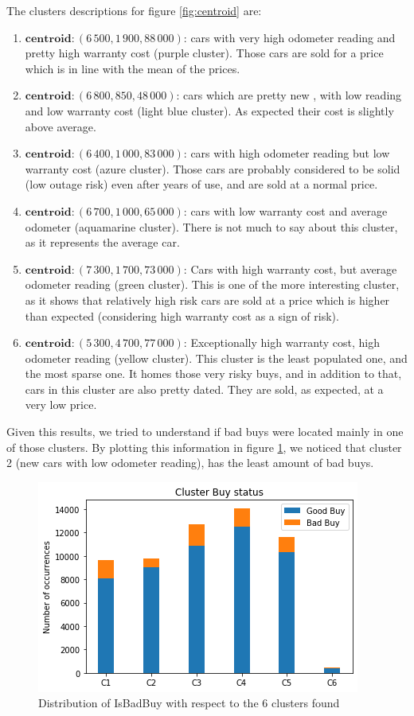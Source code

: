 \documentclass{article}
\begin{document}
The clusters descriptions for figure \ref{fig:centroid} are:
\begin{enumerate}
    \item $\mathbf{centroid}: (6\,500,  1\,900,  88\,000)$: cars with very high odometer reading and pretty high warranty cost (purple cluster). Those cars are sold for a price which is in line with the mean of the prices.
    \item $\mathbf{centroid}: (6\,800,  850,  48\,000)$: cars which are pretty new , with low  reading and low warranty cost (light blue cluster). As expected their cost is slightly above average.
    \item $\mathbf{centroid}: (6\,400,  1\,000,  83\,000)$: cars with high odometer reading but low warranty cost (azure cluster). Those cars are probably considered to be solid (low outage risk) even after years of use, and are sold at a normal price.
    \item $\mathbf{centroid}: (6\,700,  1\,000,  65\,000)$: cars with low warranty cost and average odometer (aquamarine cluster). There is not much to say about this cluster, as it represents the average car.
    \item $\mathbf{centroid}: (7\,300,  1\,700,  73\,000)$: Cars with high warranty cost, but average odometer reading (green cluster). This is one of the more interesting cluster, as it shows that relatively high risk cars are sold at a price which is higher than expected (considering high warranty cost as a sign of risk).
    \item $\mathbf{centroid}: (5\,300,  4\,700,  77\,000)$: Exceptionally high warranty cost, high odometer reading (yellow cluster). This cluster is the least populated one, and the most sparse one. It homes those very risky buys, and in addition to that, cars in this cluster are also pretty dated. They are sold, as expected, at a very low price. 
\end{enumerate}
Given this results, we tried to understand if bad buys were located mainly in one of those clusters. By plotting this information in figure \ref{fig:clusterbuy}, we noticed that cluster 2 (new cars with low odometer reading), has the least amount of bad buys.
\begin{figure}[H]
    \centering
	\includegraphics[width=.7\textwidth, keepaspectratio]{clusterbuy}
	\caption{{Distribution of IsBadBuy with respect to the 6 clusters found}}
	\label{fig:clusterbuy}
\end{figure}
\end{document}
